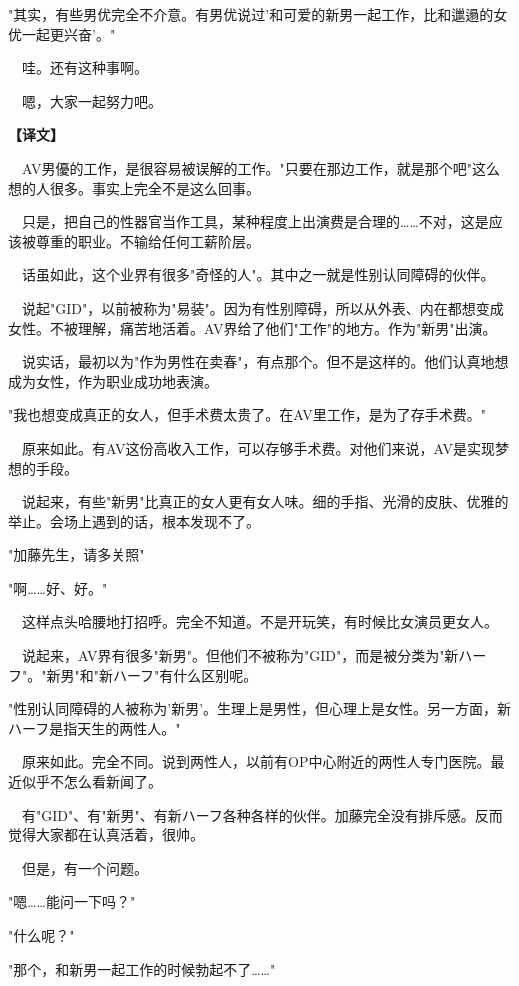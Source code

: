 \documentclass[12pt,UTF8]{ctexbook}
\begin{document}
{{"其实，有些男优完全不介意。有男优说过'和可爱的新男一起工作，比和邋遢的女优一起更兴奋'。"

　哇。还有这种事啊。

　嗯，大家一起努力吧。
}

\vspace{2ex}
\parbox{0.9\linewidth}{
\textbf{【译文】}\par

　AV男優的工作，是很容易被误解的工作。"只要在那边工作，就是那个吧"这么想的人很多。事实上完全不是这么回事。

　只是，把自己的性器官当作工具，某种程度上出演费是合理的……不对，这是应该被尊重的职业。不输给任何工薪阶层。

　话虽如此，这个业界有很多"奇怪的人"。其中之一就是性别认同障碍的伙伴。

　说起"GID"，以前被称为"易装"。因为有性别障碍，所以从外表、内在都想变成女性。不被理解，痛苦地活着。AV界给了他们"工作"的地方。作为"新男"出演。

　说实话，最初以为"作为男性在卖春"，有点那个。但不是这样的。他们认真地想成为女性，作为职业成功地表演。

"我也想变成真正的女人，但手术费太贵了。在AV里工作，是为了存手术费。"

　原来如此。有AV这份高收入工作，可以存够手术费。对他们来说，AV是实现梦想的手段。

　说起来，有些"新男"比真正的女人更有女人味。细的手指、光滑的皮肤、优雅的举止。会场上遇到的话，根本发现不了。

"加藤先生，请多关照"

"啊……好、好。"

　这样点头哈腰地打招呼。完全不知道。不是开玩笑，有时候比女演员更女人。

　说起来，AV界有很多"新男"。但他们不被称为"GID"，而是被分类为"新ハーフ"。"新男"和"新ハーフ"有什么区别呢。

"性别认同障碍的人被称为'新男'。生理上是男性，但心理上是女性。另一方面，新ハーフ是指天生的两性人。"

　原来如此。完全不同。说到两性人，以前有OP中心附近的两性人专门医院。最近似乎不怎么看新闻了。

　有"GID"、有"新男"、有新ハーフ各种各样的伙伴。加藤完全没有排斥感。反而觉得大家都在认真活着，很帅。

　但是，有一个问题。

"嗯……能问一下吗？"

"什么呢？"

"那个，和新男一起工作的时候勃起不了……"

}}
\end{document}
